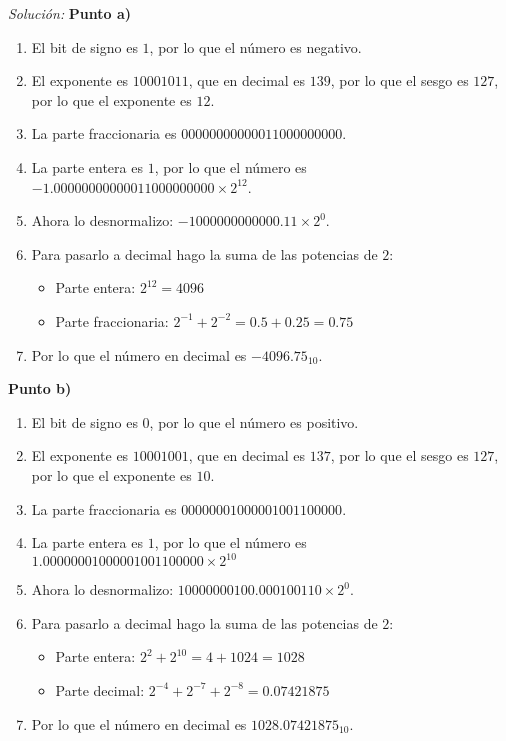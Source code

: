 \documentclass{article}
\newenvironment{solution}
    {\textit{Solución:}}
    {}
\begin{document}
\begin{solution}
\textbf{Punto a)}
\begin{enumerate}
    \item El bit de signo es $1$, por lo que el número es negativo.
    \item El exponente es $10001011$, que en decimal es $139$, por lo que el sesgo es $127$, por lo que el exponente es $12$.
    \item La parte fraccionaria es $0 0 0 0 0 0 0 0 0 0 0 0 1 1 0 0 0 0 0 0 0 0 0$.
    \item La parte entera es $1$, por lo que el número es $-1.00000000000011000000000 \times 2^{12}$.
    \item Ahora lo desnormalizo: $-1000000000000.11 \times 2^{0}$.
    \item Para pasarlo a decimal hago la suma de las potencias de $2$:
    \begin{itemize}
        \item Parte entera: $2^{12}  =4096$
        \item Parte fraccionaria: $2^{-1} + 2^{-2} = 0.5 + 0.25 = 0.75$ 
    \end{itemize}
    \item Por lo que el número en decimal es $-4096.75_{10}$.
\end{enumerate}

\textbf{Punto b)}
\begin{enumerate}
    \item El bit de signo es $0$, por lo que el número es positivo.
    \item El exponente es $10001001$, que en decimal es $137$, por lo que el sesgo es $127$, por lo que el exponente es $10$.
    \item La parte fraccionaria es $00000001000001001100000$.
    \item La parte entera es $1$, por lo que el número es $1.00000001000001001100000 \times 2^{10}$
    \item Ahora lo desnormalizo: $10000000100.000100110 \times 2^{0}$.
    \item Para pasarlo a decimal hago la suma de las potencias de $2$:
    \begin{itemize}
        \item Parte entera: $2^2+2^10 = 4 + 1024 = 1028$ 
        \item Parte decimal: $2^{-4} + 2^{-7} + 2^{-8} = 0.07421875$
    \end{itemize}
    \item Por lo que el número en decimal es $1028.07421875_{10}$.
\end{enumerate}


\end{solution}
\end{document}
